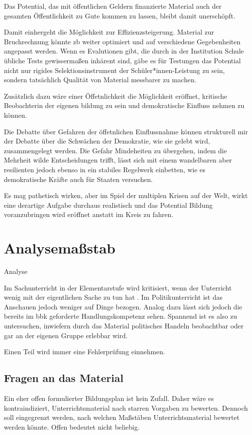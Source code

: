 Das Potential, das mit öffentlichen Geldern finanzierte Material auch der gesamten Öffentlichkeit zu Gute kommen zu lassen, bleibt damit unerschöpft.

Damit einhergeht die Möglichkeit zur Effizienzsteigerung. Material zur Bruchrechnung könnte \gls{zb} weiter optimiert und auf verschiedene Gegebenheiten angepasst werden. Wenn es Evalutionen gibt, die durch in der Institution Schule übliche Tests gewissermaßen inhärent sind, gäbe es für Testungen das Potential nicht nur rigides Selektionsinstrument der Schüler*innen-Leistung zu sein, sondern tatsächlich Qualität von Material messbarer zu machen. 

Zusätzlich dazu wäre einer Öffetnlichkeit die Möglichkeit eröffnet, kritische Beobachterin der eigenen bildung zu sein und demokratische Einfluss nehmen zu können. 

Die Debatte über Gefahren der öffetnlichen Einflussnahme können strukturell mir der Debatte über die Schwächen der Demokratie, wie sie gelebt wird, zusammengelegt werden. Die Gefahr Mindeheiten zu übergehen, indem die Mehrheit wilde Entscheidungen trifft, lässt sich mit einem wandelbaren aber resilienten jedoch ebenso in ein stabiles Regelwerk einbetten, wie es demokratische Kräfte auch für Staaten versuchen. 

Es mag pathetisch wirken, aber im Spiel der multiplen Krisen auf der Welt, wirkt eine derartige Aufgabe durchaus realistisch und das Potential Bildung voranzubringen wird eröffnet anstatt im Kreis zu fahren. 



\section{Analysemaßstab}
Analyse

Im Sachunterricht in der Elementarstufe wird kritisiert, wenn der Unterricht wenig mit der eigentlichen Sache zu tun hat \autocite[2-4]{Scholz2004}. Im Politikunterricht ist das Anschauen jedoch weniger auf Dinge bezogen. Analog dazu lässt sich jedoch die bereits im \gls{bbk} geforderte Handlungskompetenz sehen. Spannend ist es also zu untersuchen, inwiefern durch das Material politisches Handeln beobachtbar oder gar an der eigenen Gruppe erlebbar wird.




Einen Teil wird immer eine Fehlerprüfung einnehmen. 

\subsection{Fragen an das Material} %
Ein eher offen formulierter Bildungsplan ist kein Zufall. %
Daher wäre es kontraindiziert, Unterrichtsmaterial nach starren Vorgaben zu bewerten.
Dennoch soll eingegrenzt werden, nach welchen Maßstäben Unterrichtsmaterial bewertet werden könnte. Offen bedeutet nicht beliebig.

